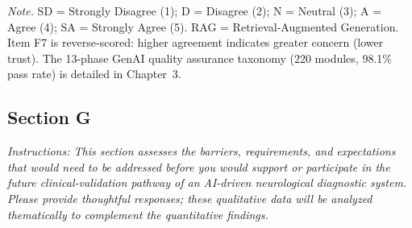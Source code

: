 \vspace{0.5em}\noindent\textit{Note.} SD = Strongly Disagree (1); D = Disagree (2); N = Neutral (3); A = Agree (4); SA = Strongly Agree (5). RAG = Retrieval-Augmented Generation. Item F7 is reverse-scored: higher agreement indicates greater concern (lower trust). The 13-phase GenAI quality assurance taxonomy (220 modules, 98.1\% pass rate) is detailed in Chapter~3.

\subsection{Section G}
\label{subsec:survey_barriers}

\noindent\textit{Instructions: This section assesses the barriers, requirements, and expectations that would need to be addressed before you would support or participate in the future clinical-validation pathway of an AI-driven neurological diagnostic system. Please provide thoughtful responses; these qualitative data will be analyzed thematically to complement the quantitative findings.}

